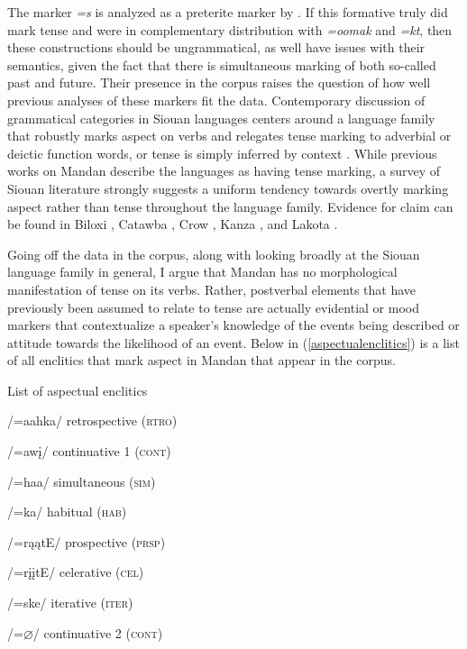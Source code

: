 The marker \textit{=s} is analyzed as a preterite marker by \citet[478]{hollow1970}. If this formative truly did mark tense and were in complementary distribution with \textit{=oomak} and \textit{=kt}, then these constructions should be ungrammatical, as well have issues with their semantics, given the fact that there is simultaneous marking of both so-called past and future. Their presence in the corpus raises the question of how well previous analyses of these markers fit the data. Contemporary discussion of grammatical categories in Siouan languages centers around a language family that robustly marks aspect on verbs and relegates tense marking to adverbial or deictic function words, or tense is simply inferred by context \citep[105]{parksrankin2001}. While previous works on Mandan describe the languages as having tense marking, a survey of Siouan literature strongly suggests a uniform tendency towards overtly marking aspect rather than tense throughout the language family. Evidence for  claim can be found in Biloxi \citep[2]{torres2010}, Catawba \citep[2]{rudes2007a}, Crow \citep[305]{graczyk2007}, Kanza \citep[vii]{cumberlandrankin2012}, and Lakota \citep[28]{ingham2003}.

Going off the data in the corpus, along with looking broadly at the Siouan language family in general, I argue that Mandan has no morphological manifestation of tense on its verbs. Rather, postverbal elements that have previously been assumed to relate to tense are actually evidential or mood markers that contextualize a speaker's knowledge of the events being described or attitude towards the likelihood of an event. Below in (\ref{aspectualenclitics}) is a list of all enclitics that mark aspect in Mandan that appear in the corpus.


\begin{exe}
\item\label{aspectualenclitics} List of aspectual enclitics

\begin{xlist}

\item /=aahka/ retrospective (\textsc{rtro})
\item /=awį/ continuative 1 (\textsc{cont})
\item /=haa/ simultaneous (\textsc{sim})
\item /=ka/ habitual (\textsc{hab})
\item /=rąątE/ prospective (\textsc{prsp})
\item /=rįįtE/ celerative (\textsc{cel})
\item /=ske/ iterative (\textsc{iter})
\item /=$\varnothing$/ continuative 2 (\textsc{cont})

\end{xlist}

\end{exe}

